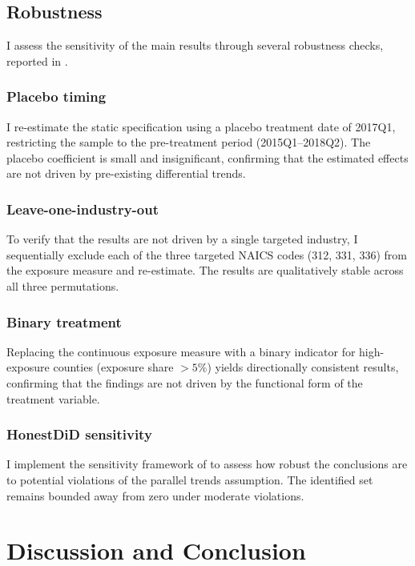 \documentclass[12pt]{article}
\begin{document}
\subsection{Robustness}

I assess the sensitivity of the main results through several robustness checks, reported in .



\subsubsection*{Placebo timing} I re-estimate the static specification using a placebo treatment date of 2017Q1, restricting the sample to the pre-treatment period (2015Q1--2018Q2). The placebo coefficient is small and insignificant, confirming that the estimated effects are not driven by pre-existing differential trends.

\subsubsection*{Leave-one-industry-out} To verify that the results are not driven by a single targeted industry, I sequentially exclude each of the three targeted NAICS codes (312, 331, 336) from the exposure measure and re-estimate. The results are qualitatively stable across all three permutations.

\subsubsection*{Binary treatment} Replacing the continuous exposure measure with a binary indicator for high-exposure counties (exposure share $> 5\%$) yields directionally consistent results, confirming that the findings are not driven by the functional form of the treatment variable.

\subsubsection*{HonestDiD sensitivity} I implement the sensitivity framework of \citet{rambachan2023more} to assess how robust the conclusions are to potential violations of the parallel trends assumption. The identified set remains bounded away from zero under moderate violations.


\section{Discussion and Conclusion}
\end{document}
